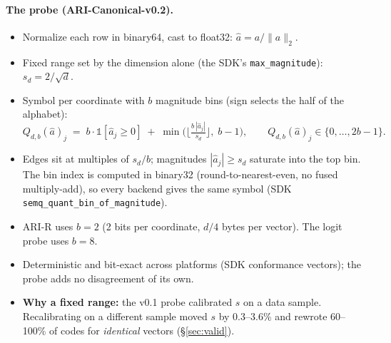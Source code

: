 \documentclass{article}
\begin{document}
\paragraph{The probe (ARI-Canonical-v0.2).}
\begin{itemize}
  \item Normalize each row in binary64, cast to float32: $\hat a = a/\lVert a\rVert_2$.
  \item Fixed range set by the dimension alone (the SDK's \texttt{max\_magnitude}): $s_d = 2/\sqrt d$.
  \item Symbol per coordinate with $b$ magnitude bins (sign selects the half of the alphabet):
  \begin{equation}
    Q_{d,b}(\hat a)_j \;=\; b\cdot\mathbb 1[\hat a_j \ge 0] \;+\; \min\!\Big(\Big\lfloor \tfrac{b\,|\hat a_j|}{s_d}\Big\rfloor,\; b-1\Big),\qquad Q_{d,b}(\hat a)_j\in\{0,\dots,2b-1\}.
  \end{equation}
  \item Edges sit at multiples of $s_d/b$; magnitudes $|\hat a_j|\ge s_d$ saturate into the top bin. The bin index is computed in binary32 (round-to-nearest-even, no fused multiply-add), so every backend gives the same symbol (SDK \texttt{semq\_quant\_bin\_of\_magnitude}).
  \item ARI-R uses $b=2$ (2 bits per coordinate, $d/4$ bytes per vector). The logit probe uses $b=8$.
  \item Deterministic and bit-exact across platforms (SDK conformance vectors); the probe adds no disagreement of its own.
  \item \textbf{Why a fixed range:} the v0.1 probe calibrated $s$ on a data sample. Recalibrating on a different sample moved $s$ by 0.3--3.6\% and rewrote 60--100\% of codes for \emph{identical} vectors (\S\ref{sec:valid}).
\end{itemize}
\end{document}
